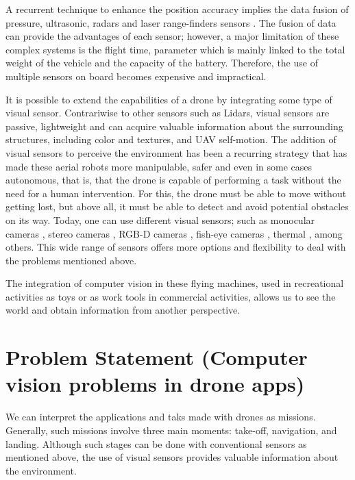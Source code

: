 A recurrent technique to enhance the position accuracy implies the data fusion of pressure, ultrasonic, radars and laser range-finders sensors \citep{Tomic.Schmid.ea:IRAM:2012}. The fusion of data can provide the advantages of each sensor; however, a major limitation of these complex systems is the flight time, parameter which is mainly linked to the total weight of the vehicle and the capacity of the battery. Therefore, the use of multiple sensors on board becomes expensive and impractical.

It is possible to extend the capabilities of a drone by integrating some type of visual sensor. Contrariwise to other sensors such as Lidars, visual sensors are passive, lightweight and can acquire valuable information about the surrounding structures, including color and textures, and UAV self-motion. The addition of visual sensors to perceive the environment has been a recurring strategy that has made these aerial robots more manipulable, safer and even in some cases autonomous, that is, that the drone is capable of performing a task without the need for a human intervention. For this, the drone must be able to move without getting lost, but above all, it must be able to detect and avoid potential obstacles on its way. 
Today, one can use different visual sensors; such as monocular cameras \citep{Padhy.Xia.ea:TSC:2018}, stereo cameras \citep{Seitz.Curless.ea:CVPR:2006}, RGB-D cameras \citep{Huang.Bachrach.ea:RobR:2017}, fish-eye cameras \citep{Hrabar.Sukhatme:IROS:2004}, thermal \citep{Gaszczak.Breckon.ea:IRCV:2011}, among others. This wide range of sensors offers more options and flexibility to deal with the problems mentioned above. 

The integration of computer vision in these flying machines, used in recreational activities as toys or as work tools in commercial activities, allows us to see the world and obtain information from another perspective.
 
\section*{Problem Statement (Computer vision problems in drone apps)}
 
We can interpret the applications and taks made with drones as missions. Generally, such missions involve three main moments: take-off, navigation, and landing. Although such stages can be done with conventional sensors as mentioned above, the use of visual sensors provides valuable information about the environment. 

